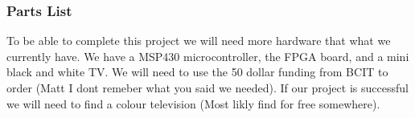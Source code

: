 \subsubsection*{Parts List}

To be able to complete this project we will need more hardware that what we 
currently have. We have a MSP430 microcontroller, the FPGA board, and a mini
black and white TV. We will need to use the 50 dollar funding from BCIT to order
(Matt I dont remeber what you said we needed). If our project is successful we 
will need to find a colour television (Most likly find for free somewhere).

